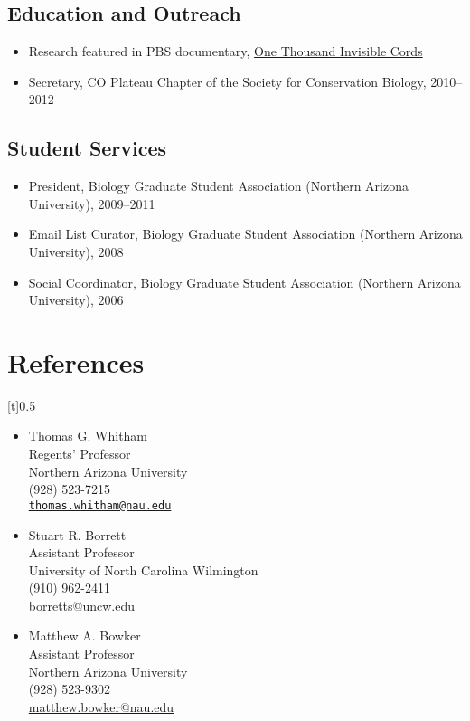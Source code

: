\documentclass[]{article}
\begin{document}
\subsection{Education and Outreach}\label{education-and-outreach}

\begin{itemize}
\item
  Research featured in PBS documentary,
  \href{http://nau.edu/Research/Feature-Stories/A-Thousand-Invisible-Cords/}{One
  Thousand Invisible Cords}
\item
  Secretary, CO Plateau Chapter of the Society for Conservation Biology,
  2010--2012
\end{itemize}

\subsection{Student Services}\label{student-services}

\begin{itemize}
\item
  President, Biology Graduate Student Association (Northern Arizona
  University), 2009--2011
\item
  Email List Curator, Biology Graduate Student Association (Northern
  Arizona University), 2008
\item
  Social Coordinator, Biology Graduate Student Association (Northern
  Arizona University), 2006
\end{itemize}

\section{References}\label{references}

{[}t{]}{0.5}

\begin{itemize}
\item
  Thomas G. Whitham\\ Regents' Professor\\ Northern Arizona
  University\\(928)
  523-7215\\\href{mailto:thomas.whitham@nau.edu}{\texttt{thomas.whitham@nau.edu}}
\item
  Stuart R. Borrett\\ Assistant Professor\\ University of North Carolina
  Wilmington\\(910)
  962-2411\\\href{mailto:borretts@uncw.edu}{borretts@uncw.edu}
\item
  Matthew A. Bowker\\ Assistant Professor\\ Northern Arizona
  University\\(928)
  523-9302\\\href{mailto:matthew.bowker@nau.edu}{matthew.bowker@nau.edu}
\end{itemize}
\end{document}
